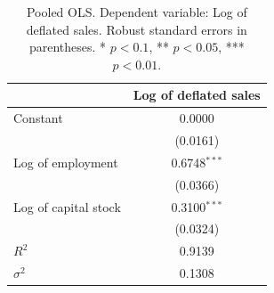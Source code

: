 \begin{table}[!htbp]
\centering
\begin{tabular}{lc}
\toprule
 & Log of deflated sales \\
\midrule
Constant & 0.0000 \\
 & (0.0161) \\
\addlinespace
Log of employment & 0.6748$^{***}$ \\
 & (0.0366) \\
\addlinespace
Log of capital stock & 0.3100$^{***}$ \\
 & (0.0324) \\
\midrule
$R^2$ & 0.9139 \\
$\sigma^2$ & 0.1308 \\
\bottomrule
\end{tabular}
\caption{Pooled OLS. Dependent variable: Log of deflated sales. Robust standard errors in parentheses. * $p<0.1$, ** $p<0.05$, *** $p<0.01$.}
\label{tab:pooled_ols}
\end{table}
